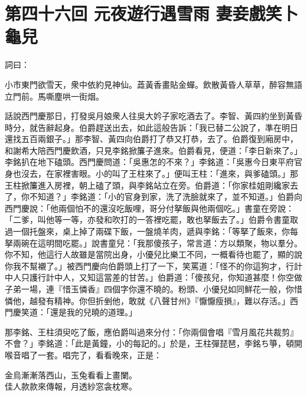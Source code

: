 
\chapter*{第四十六回 元夜遊行遇雪雨 妻妾戲笑卜龜兒}


詞曰：

\begin{myquote}
小市東門欲雪天，衆中依約見神仙。蕋黃香畫貼金蟬。飲散黃昏人草草，醉容無語立門前。馬嘶塵哄一街烟。

\end{myquote}

話說西門慶那日，打發吳月娘衆人往吳大妗子家吃酒去了。李智、黃四約坐到黃昏時分，就告辭起身。伯爵趕送出去，如此這般告訴：「我已替二公說了，準在明日還找五百兩銀子。」那李智、黃四向伯爵打了恭又打恭，去了。伯爵復到廂房中，和謝希大陪西門慶飲酒，只見李銘掀簾子進來。伯爵看見，便道：「李日新來了。」李銘扒在地下磕頭。西門慶問道：「吳惠怎的不來？」李銘道：「吳惠今日東平府官身也沒去，在家裡害眼。小的叫了王柱來了。」便叫王柱：「進來，與爹磕頭。」那王柱掀簾進入房裡，朝上磕了頭，與李銘站立在旁。伯爵道：「你家桂姐剛纔家去了，你不知道？」李銘道：「小的官身到家，洗了洗臉就來了，並不知道。」伯爵向西門慶說：「他兩個怕不的還沒吃飯哩，哥分付拏飯與他兩個吃。」書童在旁說：「二爹，叫他等一等，亦發和吹打的一答裡吃罷，敢也拏飯去了。」伯爵令書童取過一個托盤來，桌上掉了兩碟下飯，一盤燒羊肉，遞與李銘：「等拏了飯來，你每拏兩碗在這明間吃罷。」說書童兒：「我那傻孩子，常言道：方以類聚，物以羣分。你不知，他這行人故雖是當院出身，小優兒比樂工不同，一概看待也罷了，顯的說你我不幫襯了。」被西門慶向伯爵頭上打了一下，笑罵道：「怪不的你這狗才，行計中人只護行計中人，又知這當差的甘苦。」伯爵道：「傻孩兒，你知道甚麼！你空做子弟一場，連『惜玉憐香』四個字你還不曉的。粉頭、小優兒如同鮮花一般，你惜憐他，越發有精神。你但折剉他，敢就《八聲甘州》『懨懨瘦損』，難以存活。」西門慶笑道：「還是我的兒曉的道理。」

那李銘、王柱須臾吃了飯，應伯爵叫過來分付：「你兩個會唱『雪月風花共裁剪』不會？」李銘道：「此是黃鐘，小的每記的。」於是，王柱彈琵琶，李銘ち箏，頓開喉音唱了一套。唱完了，看看晚來，正是：

\begin{myquote}
金烏漸漸落西山，玉兔看看上畫闌。\\佳人款款來傳報，月透紗窓衾枕寒。
\end{myquote}

